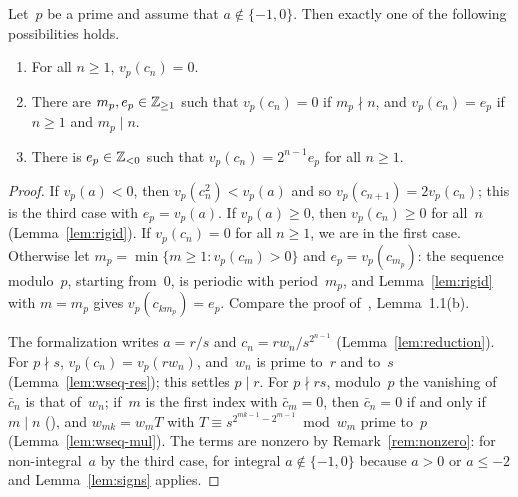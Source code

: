\begin{lemma}
  \label{lem:vp}
  \leanok
  Let~$p$ be a prime and assume that $a \notin \{-1, 0\}$. Then exactly one of the following
  possibilities holds.
  \begin{enumerate}
    \item For all $n \ge 1$, $v_p(c_n) = 0$.
    \item There are $m_p, e_p \in \mathbb{Z}_{\ge 1}$ such that $v_p(c_n) = 0$ if $m_p \nmid n$, and
          $v_p(c_n) = e_p$ if $n \ge 1$ and $m_p \mid n$.
    \item There is $e_p \in \mathbb{Z}_{< 0}$ such that $v_p(c_n) = 2^{n-1} e_p$ for all $n \ge 1$.
  \end{enumerate}
\end{lemma}
\begin{proof}
  \leanok
  If $v_p(a) < 0$, then $v_p(c_n^2) < v_p(a)$ and so $v_p(c_{n+1}) = 2 v_p(c_n)$; this is the
  third case with $e_p = v_p(a)$. If $v_p(a) \ge 0$, then $v_p(c_n) \ge 0$ for all~$n$
  (Lemma~\ref{lem:rigid}). If $v_p(c_n) = 0$ for all $n \ge 1$, we are in the first case.
  Otherwise let $m_p = \min\{m \ge 1 : v_p(c_m) > 0\}$ and $e_p = v_p(c_{m_p})$: the sequence
  modulo~$p$, starting from~$0$, is periodic with period~$m_p$, and Lemma~\ref{lem:rigid} with
  $m = m_p$ gives $v_p(c_{k m_p}) = e_p$. Compare the proof of~\cite{paper}, Lemma~1.1(b).

  The formalization writes $a = r/s$ and $c_n = r w_n / s^{2^{n-1}}$ (Lemma~\ref{lem:reduction}).
  For $p \nmid s$, $v_p(c_n) = v_p(r w_n)$, and~$w_n$ is prime to~$r$ and to~$s$
  (Lemma~\ref{lem:wseq-res}); this settles $p \mid r$. For $p \nmid rs$, modulo~$p$ the vanishing
  of~$\bar c_n$ is that of~$w_n$; if~$m$ is the first index with $\bar c_m = 0$, then
  $\bar c_n = 0$ if and only if $m \mid n$ (), and
  $w_{mk} = w_m T$ with $T \equiv s^{2^{mk-1} - 2^{m-1}} \bmod w_m$ prime to~$p$
  (Lemma~\ref{lem:wseq-mul}). The terms are nonzero by Remark~\ref{rem:nonzero}: for
  non-integral~$a$ by the third case, for integral $a \notin \{-1, 0\}$ because $a > 0$ or
  $a \le -2$ and Lemma~\ref{lem:signs} applies.
\end{proof}

